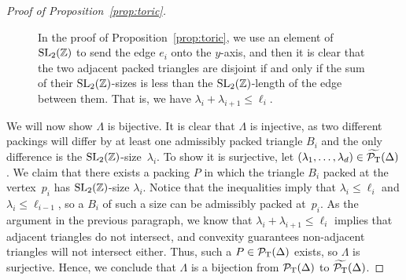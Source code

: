 \documentclass[10pt,a4paper]{amsart}
\numberwithin{equation}{section}
\def\Z{{\mathbb Z}}
\newcommand{\De}{\Delta}
\newcommand{\PT}{\mathcal{P}_{\rm T}}
\newcommand{\PTtilde}{\widetilde{\PT}}
\newcommand{\SL}{{\rm SL}_2(\Z)}
\theoremstyle{definition}
\theoremstyle{plain}
\theoremstyle{plain}
\begin{document}
\begin{proof}[Proof of Proposition~\ref{prop:toric}]
\begin{figure}[t] \centering
 \caption{In the proof of Proposition~\ref{prop:toric}, we use an element of $\SL$ to send the edge $e_i$ onto the $y$-axis, and then it is clear that the two adjacent packed triangles are disjoint if and only if the sum of their $\SL$-sizes is less than the $\SL$-length of the edge between them. That is, we have $\lambda_{i}+\lambda_{i+1}\leq \ell_i$.} \label{fig:toric-proof}
\end{figure}

We will now show $\Lambda$ is bijective.
It is clear that $\Lambda$ is injective, as two different packings will differ by at least one admissibly packed triangle $B_i$ and the only difference is the $\SL$-size~$\lambda_i$. To show it is surjective, let $(\lambda_1,\ldots,\lambda_d) \in \PTtilde(\De)$. We claim that there exists a packing $P$ in which the triangle $B_i$ packed at the vertex~$p_i$ has $\SL$-size $\lambda_i$. Notice that the inequalities imply that $\lambda_i \leq \ell_i$ and $\lambda_i \leq \ell_{i-1}$, so a $B_i$ of such a size can be admissibly packed at~$p_i$. As the argument in the previous paragraph, we know that $\lambda_i+\lambda_{i+1}\leq \ell_i$ implies that adjacent triangles do not intersect, and convexity guarantees non-adjacent triangles will not intersect either.
Thus, such a $P\in\PT(\De)$ exists, so $\Lambda$ is surjective.
Hence, we conclude that $\Lambda$ is a bijection from $\PT(\De)$ to $\PTtilde(\De)$.




\end{proof}
\end{document}

